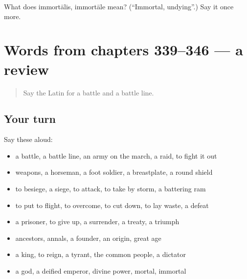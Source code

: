 \begin{tcolorbox}[breakable,colback=teal!4,colframe=teal!35!black,title={Before you move on}]
What does immortālis, immortāle mean? (\textquotedblleft{}Immortal, undying\textquotedblright{}.) Say it once more.
\end{tcolorbox}
\section[(dialogue)]{Words from chapters 339–346 — a review}

\label{lesson:LA-R346-review-339-346}



\begin{quote}
Say the Latin for a battle and a battle line.
\end{quote}

\subsection*{Your turn}
Say these aloud:

\begin{itemize}
\raggedright
  \item a battle, a battle line, an army on the march, a raid, to fight it out
  \item weapons, a horseman, a foot soldier, a breastplate, a round shield
  \item to besiege, a siege, to attack, to take by storm, a battering ram
  \item to put to flight, to overcome, to cut down, to lay waste, a defeat
  \item a prisoner, to give up, a surrender, a treaty, a triumph
  \item ancestors, annals, a founder, an origin, great age
  \item a king, to reign, a tyrant, the common people, a dictator
  \item a god, a deified emperor, divine power, mortal, immortal
\end{itemize}

